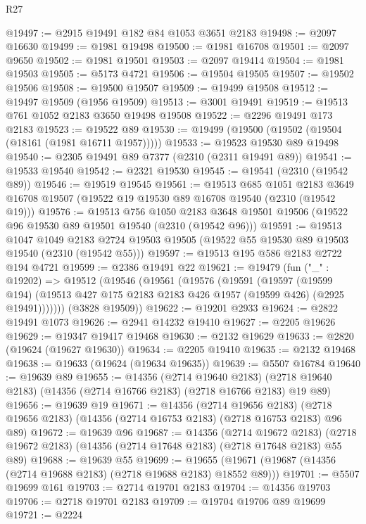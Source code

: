 \begin{lexlean}{R27}
\begin{coremodule}
@19497 := @2915 @19491 @182 @84 @1053 @3651 @2183
@19498 := @2097 @16630
@19499 := @1981 @19498
@19500 := @1981 @16708
@19501 := @2097 @9650
@19502 := @1981 @19501
@19503 := @2097 @19414
@19504 := @1981 @19503
@19505 := @5173 @4721
@19506 := @19504 @19505
@19507 := @19502 @19506
@19508 := @19500 @19507
@19509 := @19499 @19508
@19512 := @19497 @19509 (@1956 @19509)
@19513 := @3001 @19491
@19519 := @19513 @761 @1052 @2183 @3650 @19498 @19508
@19522 := @2296 @19491 @173 @2183
@19523 := @19522 @89
@19530 := @19499 (@19500 (@19502 (@19504 (@18161 (@1981 @16711 @1957)))))
@19533 := @19523 @19530 @89 @19498
@19540 := @2305 @19491 @89 @7377 (@2310 (@2311 @19491 @89))
@19541 := @19533 @19540
@19542 := @2321 @19530
@19545 := @19541 (@2310 (@19542 @89))
@19546 := @19519 @19545
@19561 := @19513
    @685
    @1051
    @2183
    @3649
    @16708
    @19507
    (@19522 @19 @19530 @89 @16708 @19540 (@2310 (@19542 @19)))
@19576 := @19513
    @756
    @1050
    @2183
    @3648
    @19501
    @19506
    (@19522 @96 @19530 @89 @19501 @19540 (@2310 (@19542 @96)))
@19591 := @19513
    @1047
    @1049
    @2183
    @2724
    @19503
    @19505
    (@19522 @55 @19530 @89 @19503 @19540 (@2310 (@19542 @55)))
@19597 := @19513 @195 @586 @2183 @2722 @194 @4721
@19599 := @2386 @19491 @22
@19621 := @19479
    (fun ("_" : @19202) =>
    @19512
      (@19546
        (@19561
          (@19576
            (@19591
              (@19597
                (@19599 @194)
                (@19513 @427 @175 @2183 @2183 @426 @1957 (@19599 @426) (@2925 @19491)))))))
      (@3828 @19509))
@19622 := @19201 @2933
@19624 := @2822 @19491 @1073
@19626 := @2941 @14232 @19410
@19627 := @2205 @19626
@19629 := @19347 @19417 @19468
@19630 := @2132 @19629
@19633 := @2820 (@19624 (@19627 @19630))
@19634 := @2205 @19410
@19635 := @2132 @19468
@19638 := @19633 (@19624 (@19634 @19635))
@19639 := @5507 @16784
@19640 := @19639 @89
@19655 := @14356
    (@2714 @19640 @2183)
    (@2718 @19640 @2183)
    (@14356 (@2714 @16766 @2183) (@2718 @16766 @2183) @19 @89)
@19656 := @19639 @19
@19671 := @14356
    (@2714 @19656 @2183)
    (@2718 @19656 @2183)
    (@14356 (@2714 @16753 @2183) (@2718 @16753 @2183) @96 @89)
@19672 := @19639 @96
@19687 := @14356
    (@2714 @19672 @2183)
    (@2718 @19672 @2183)
    (@14356 (@2714 @17648 @2183) (@2718 @17648 @2183) @55 @89)
@19688 := @19639 @55
@19699 := @19655 (@19671 (@19687 (@14356 (@2714 @19688 @2183) (@2718 @19688 @2183) @18552 @89)))
@19701 := @5507 @19699 @161
@19703 := @2714 @19701 @2183
@19704 := @14356 @19703
@19706 := @2718 @19701 @2183
@19709 := @19704 @19706 @89 @19699
@19721 := @2224

\end{coremodule}
\end{lexlean}
